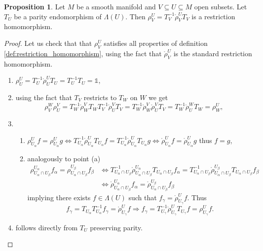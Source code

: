 \documentclass{article}
\theoremstyle{definition}
\newtheorem{proposition}{Proposition}
\begin{document}
\begin{proposition}
    Let $M$ be a smooth manifold and $V \subseteq U \subseteq M$ open subsets. Let $T_U$ be a parity endomorphism of $\Lambda(U)$. Then $\rho_V^U = T_V^{-1} \mathring{\rho}_V^U T_V$ is a restriction homomorphism.
\end{proposition}
\begin{proof}
    Let us check that that $\rho_V^U$ satisfies all properties of definition \ref{def:restriction_homomorphism}, using the fact that $\mathring{\rho}_V^U$ is the standard restriction homomorphism.
    \begin{enumerate}
        \item $\rho_U^U = T_U^{-1} \mathring{\rho}_U^U T_U = T_U^{-1} T_U = \mathds{1}$,
        \item using the fact that $T_V$ restricts to $T_W$ on $W$ we get
        \begin{equation*}
            \rho_V^W \rho_U^V = T_W^{-1} \mathring{\rho}_W^V T_W T_V^{-1} \mathring{\rho}_U^V T_V = T_W^{-1} \mathring{\rho}_W^V \mathring{\rho}_U^V T_V
            = T_W^{-1} \mathring{\rho}_U^W T_W = \rho_W^U,
        \end{equation*}
        \item
        \begin{enumerate}
            \item $\rho_{U_\alpha}^U f = \rho_{U_\alpha}^U g \Leftrightarrow 
            T_{U_\alpha}^{-1}\mathring{\rho}_{U_\alpha}^U T_{U_\alpha} f = T_{U_\alpha}^{-1}\mathring{\rho}_{U_\alpha}^U T_{U_\alpha} g \Leftrightarrow
            \mathring{\rho}_{U_\alpha}^U f = \mathring{\rho}_{U_\alpha}^U g$
            thus $f = g$,
            \item analogously to point (a)
            \begin{align*}
            \rho_{U_\alpha \cap U_\beta}^{U_\alpha} f_\alpha = \rho_{U_\alpha \cap U_\beta}^{U_\beta} f_\beta &\Leftrightarrow
            T_{U_\alpha \cap U_\beta}^{-1} \mathring{\rho}_{U_\alpha \cap U_\beta}^{U_\alpha} T_{U_\alpha \cap U_\beta} f_\alpha = T_{U_\alpha \cap U_\beta}^{-1} \mathring{\rho}_{U_\alpha \cap U_\beta}^{U_\beta} T_{U_\alpha \cap U_\beta} f_\beta \\
            &\Leftrightarrow \mathring{\rho}_{U_\alpha \cap U_\beta}^{U_\alpha} f_\alpha = \mathring{\rho}_{U_\alpha \cap U_\beta}^{U_\beta} f_\beta
            \end{align*}
            implying there exists $f \in \Lambda(U)$ such that $f_\gamma = \mathring{\rho}_{U_\gamma}^U f$. Thus
            \begin{equation*}
                f_\gamma = T_{U_\alpha} T_{U_\alpha}^{-1} f_\gamma = \mathring{\rho}_{U_\gamma}^U f \Longrightarrow
                f_\gamma = T_{U_\gamma}^{-1} \mathring{\rho}_{U_\gamma}^U T_{U_\gamma} f
                = \rho_{U_\gamma}^U f.
            \end{equation*} 
        \end{enumerate}
        \item follows directly from $T_U$ preserving parity.
    \end{enumerate}
\end{proof}
\end{document}
